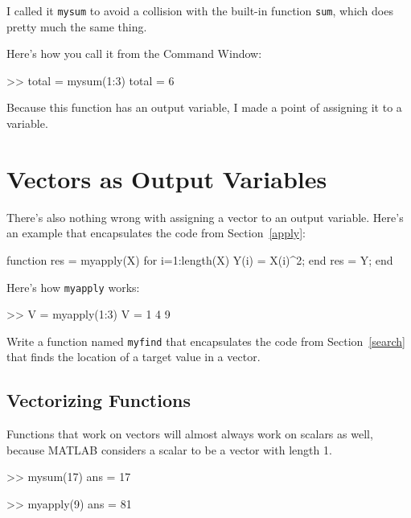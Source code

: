 I called it {\tt mysum} to avoid a collision with the built-in
function {\tt sum}, which does pretty much the same thing.


Here's how you call it from the Command Window:

\begin{code}
>> total = mysum(1:3)
total = 6
\end{code}

Because this function has an output variable, I made a
point of assigning it to a variable.



\section{Vectors as Output Variables}

There's also nothing wrong with assigning a vector to an output
variable. Here's an example that encapsulates the code from
Section~\ref{apply}:

\begin{code}
function res = myapply(X)
    for i=1:length(X)
        Y(i) = X(i)^2;
    end
    res = Y;
end
\end{code}

Here's how {\tt myapply} works:

\begin{code}
>> V = myapply(1:3)
V = 1     4     9
\end{code}

\begin{ex}
Write a function named {\tt myfind} that
encapsulates the code from Section~\ref{search} that finds the
location of a target value in a vector.
\end{ex}


\subsection{Vectorizing Functions}

Functions that work on vectors will almost always work on scalars
as well, because MATLAB considers a scalar to be a vector with
length 1.


\begin{code}
>> mysum(17)
ans = 17

>> myapply(9)
ans = 81
\end{code}

